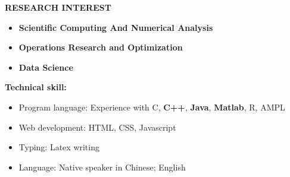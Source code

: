 \documentclass[]{article}
\newcommand{\rightAlign}{38em}
\begin{document}
	
	\textbf{RESEARCH INTEREST}
		\begin{itemize}
				\item 
			\begin{minipage}{\rightAlign}
				\begin{flushleft}                           
					\textbf{Scientific Computing And Numerical Analysis} 
				\end{flushleft} 
			\end{minipage}
 		\item 
		\begin{minipage}{\rightAlign}
 			\begin{flushleft}                           
 				\textbf{Operations Research and  Optimization} 
 			\end{flushleft} 
 		\end{minipage}

		\item 
		\begin{minipage}{\rightAlign}
 			\begin{flushleft}                           
 				\textbf{Data Science} 
 			\end{flushleft} 
 		\end{minipage}
 	\end{itemize}
	
	
	\textbf{Technical skill:}
	\begin{itemize}[itemsep=0ex,leftmargin=1cm,rightmargin=.16\textwidth]
		\item Program language: Experience with C, \textbf{C++}, \textbf{Java}, \textbf{Matlab}, R, AMPL
		\item Web development: HTML, CSS, Javascript 
		\item Typing: Latex writing \\
		\item Language: Native speaker in Chinese; English
	\end{itemize} 


	
	
\end{document}
